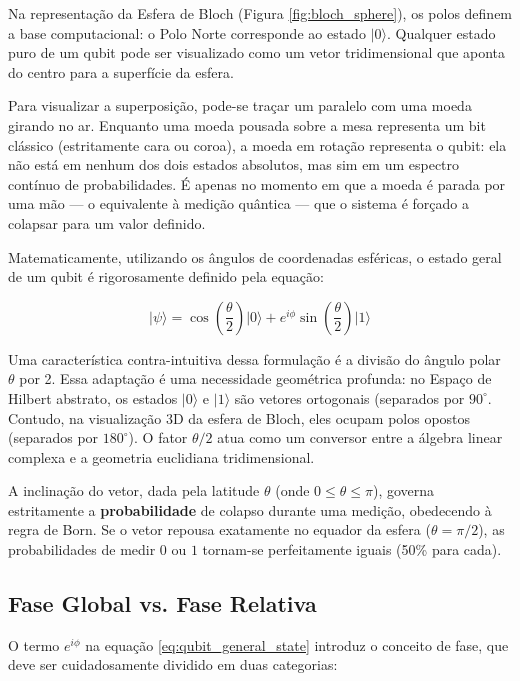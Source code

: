 \documentclass[12pt, a4paper]{article}
\newcommand{\ket}[1]{\lvert #1 \rangle}
\begin{document}
Na representação da Esfera de Bloch (Figura \ref{fig:bloch_sphere}), os polos definem a base computacional: o Polo Norte corresponde ao estado $\ket{0}$. Qualquer estado puro de um qubit pode ser visualizado como um vetor tridimensional que aponta do centro para a superfície da esfera.

Para visualizar a superposição, pode-se traçar um paralelo com uma moeda girando no ar. Enquanto uma moeda pousada sobre a mesa representa um bit clássico (estritamente cara ou coroa), a moeda em rotação representa o qubit: ela não está em nenhum dos dois estados absolutos, mas sim em um espectro contínuo de probabilidades. É apenas no momento em que a moeda é parada por uma mão --- o equivalente à medição quântica --- que o sistema é forçado a colapsar para um valor definido.

Matematicamente, utilizando os ângulos de coordenadas esféricas,  o estado geral de um qubit é rigorosamente definido pela equação:

\begin{equation}
    \ket{\psi} = \cos\left(\frac{\theta}{2}\right)\ket{0} + e^{i\phi}\sin\left(\frac{\theta}{2}\right)\ket{1}
    \label{eq:qubit_general_state}
\end{equation}

Uma característica contra-intuitiva dessa formulação é a divisão do ângulo polar $\theta$ por 2. Essa adaptação é uma necessidade geométrica profunda: no Espaço de Hilbert abstrato, os estados $\ket{0}$ e $\ket{1}$ são vetores ortogonais (separados por $90^\circ$. Contudo, na visualização 3D da esfera de Bloch, eles ocupam polos opostos (separados por $180^\circ$). O fator $\theta/2$ atua como um conversor entre a álgebra linear complexa e a geometria euclidiana tridimensional.

A inclinação do vetor, dada pela latitude $\theta$ (onde $0 \le \theta \le \pi$), governa estritamente a \textbf{probabilidade} de colapso durante uma medição, obedecendo à regra de Born. Se o vetor repousa exatamente no equador da esfera ($\theta = \pi/2$), as probabilidades de medir $0$ ou $1$ tornam-se perfeitamente iguais (50\% para cada).

\subsection{Fase Global vs. Fase Relativa}

O termo $e^{i\phi}$ na equação \ref{eq:qubit_general_state} introduz o conceito de fase, que deve ser cuidadosamente dividido em duas categorias:
\end{document}
